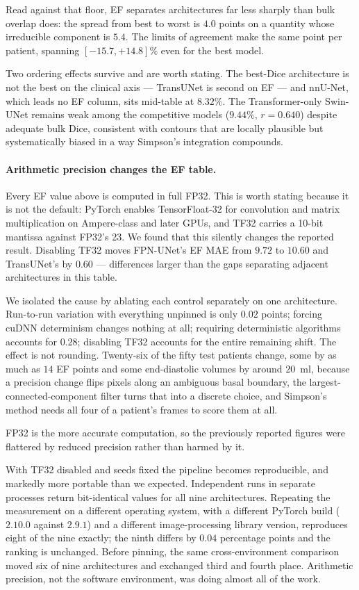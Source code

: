 Read against that floor, EF separates architectures far less sharply than bulk
overlap does: the spread from best to worst is $4.0$ points on a quantity
whose irreducible component is $5.4$. The limits of agreement make the same
point per patient, spanning
$[-15.7, +14.8]\%$
even for the best model.

Two ordering effects survive and are worth stating. The best-Dice architecture
is not the best on the clinical axis --- TransUNet is second on EF --- and
nnU-Net, which leads no EF column, sits mid-table at $8.32\%$. The
Transformer-only Swin-UNet remains weak among the competitive models
($9.44\%$, $r = 0.640$) despite adequate bulk Dice,
consistent with contours that are locally plausible but systematically biased in
a way Simpson's integration compounds.

\paragraph{Arithmetic precision changes the EF table.}
Every EF value above is computed in full FP32. This is worth stating because it
is not the default: PyTorch enables TensorFloat-32 for convolution and matrix
multiplication on Ampere-class and later GPUs, and TF32 carries a 10-bit
mantissa against FP32's 23. We found that this silently changes the reported
result. Disabling TF32 moves FPN-UNet's EF MAE from $9.72$ to $10.60$ and
TransUNet's by $0.60$ --- differences larger than the gaps separating adjacent
architectures in this table.

We isolated the cause by ablating each control separately on one architecture.
Run-to-run variation with everything unpinned is only $0.02$ points; forcing
cuDNN determinism changes nothing at all; requiring deterministic algorithms
accounts for $0.28$; disabling TF32 accounts for the entire remaining shift.
The effect is not rounding. Twenty-six of the fifty test patients change, some
by as much as $14$ EF points and some end-diastolic volumes by around $20$~ml,
because a precision change flips pixels along an ambiguous basal boundary, the
largest-connected-component filter turns that into a discrete choice, and
Simpson's method needs all four of a patient's frames to score them at all.

FP32 is the more accurate computation, so the previously reported figures were
flattered by reduced precision rather than harmed by it.

With TF32 disabled and seeds fixed the pipeline becomes reproducible, and
markedly more portable than we expected. Independent runs in separate processes
return bit-identical values for all nine architectures. Repeating the
measurement on a different operating system, with a different PyTorch build
($2.10.0$ against $2.9.1$) and a different image-processing library version,
reproduces eight of the nine exactly; the ninth differs by $0.04$ percentage
points and the ranking is unchanged. Before pinning, the same cross-environment
comparison moved six of nine architectures and exchanged third and fourth place.
Arithmetic precision, not the software environment, was doing almost all of the
work.

